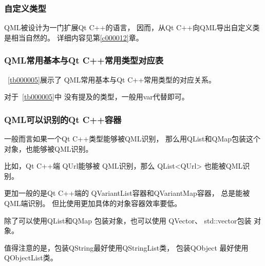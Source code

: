 \subsubsection{
自定义类型
}\label{c000011s000000s01s03}

QML被设计为一门扩展Qt C{\sourcefonttwo{}+}{\sourcefonttwo{}+}的语言，
因而，从Qt C{\sourcefonttwo{}+}{\sourcefonttwo{}+}向QML导出自定义类是相当自然的。
详细内容见第\ref{c000012}章。

\FloatBarrier
\subsubsection{
QML常用基本与Qt C{\sourcefonttwo{}+}{\sourcefonttwo{}+}常用类型对应表
}\label{c000011s000000s01s04}


\tablename\ \ref{tb000005}展示了
QML常用基本与Qt C{\sourcefonttwo{}+}{\sourcefonttwo{}+}常用类型的对应关系。



对于\tablename\ \ref{tb000005}中
没有提及的类型，一般用var代替即可。

\FloatBarrier
\subsubsection{
QML可以识别的Qt C{\sourcefonttwo{}+}{\sourcefonttwo{}+}容器
}\label{c000011s000000s01s05}


一般而言如果一个Qt C{\sourcefonttwo{}+}{\sourcefonttwo{}+}类型能够被QML识别，
那么用QList和QMap包装这个对象，也能够被QML识别。

比如，Qt C{\sourcefonttwo{}+}{\sourcefonttwo{}+}端
QUrl能够被
QML识别，那么
QList<QUrl>
也能被QML识别。

更加一般的是Qt C{\sourcefonttwo{}+}{\sourcefonttwo{}+}端的
QVariantList容器和QVariantMap容器，
总是能被QML端识别。
但比使用更加具体的对象容器效率要低。

除了可以使用QList和QMap
包装对象，也可以使用
QVector、
std::vector包装
对象。

值得注意的是，包装QString最好使用QStringList类，
包装QObject \raisebox{-0.35ex}{\sourcefonttwo{}*} 最好使用QObjectList类。












